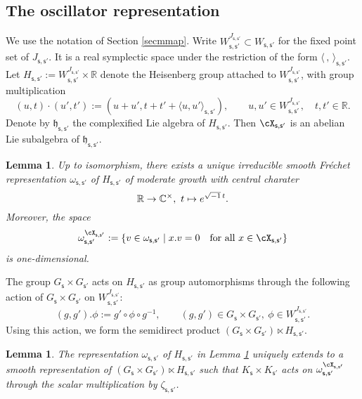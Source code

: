 \documentclass[12pt,a4paper]{amsart}
\newcommand{\h}{\mathfrak h}
\newcommand{\R}{\mathbb R}
\newcommand{\la}{\langle}
\newcommand{\ra}{\rangle}
\numberwithin{equation}{section}
\newtheorem{lem}[thm]{Lemma}
\theoremstyle{remark}
\begin{document}
\subsection{The oscillator representation}\label{secoscil}
We use the notation of Section \ref{secmmap}. Write
$
  W_{\mathsf s, \mathsf s'}^{J_{\mathsf s, \mathsf s'}}\subset W_{\mathsf s, \mathsf s'}
$
for the fixed point set of $J_{\mathsf s, \mathsf s'}$. It is a real symplectic space under the restriction of the form $\la\,,\,\ra_{\mathsf s, \mathsf s'}$. Let $H_{\mathsf s, \mathsf s'}:= W_{\mathsf s, \mathsf s'}^{J_{\mathsf s, \mathsf s'}}\times \R$
denote the Heisenberg group attached to $W_{\mathsf s, \mathsf s'}^{J_{\mathsf s, \mathsf s'}}$, with group multiplication
\[
  (u,t)\cdot (u', t'):=(u+u', t+t'+\la u, u'\ra_{\mathsf s, \mathsf s'}), \qquad u,u'\in  W_{\mathsf s, \mathsf s'}^{J_{\mathsf s, \mathsf s'}}, \quad t, t'\in \R.
\]
Denote by $\h_{\mathsf s, \mathsf s'}$ the complexified Lie algebra of $H_{\mathsf s, \mathsf s'}$. Then  $\cX_{\mathsf s, \mathsf s'}$ is  an abelian Lie subalgebra of $\h_{\mathsf s, \mathsf s'}$.

\begin{lem}\label{vn}
Up to isomorphism, there exists a unique irreducible smooth Fr\'echet representation $\omega_{\mathsf s, \mathsf s'}$ of $H_{\mathsf s, \mathsf s'}$ of moderate growth with central charater
\[
\R\rightarrow \C^\times, \ t\mapsto e^{\sqrt{-1}\, t}.
\]
Moreover, the space
\[
  \omega_{\mathsf s, \mathsf s'}^{\cX_{\mathsf s, \mathsf s'}}:=\{v\in \omega_{\mathsf s, \mathsf s'}\mid x.v=0\quad \textrm{for all $x\in \cX_{\mathsf s, \mathsf s'}$}\}
\]
is one-dimensional.
\end{lem}



The group $G_{\mathsf s}\times G_{\mathsf s'}$ acts on $H_{\mathsf s, \mathsf s'}$ as group automorphisms through the following action of $G_{\mathsf s}\times G_{\mathsf s'}$ on  $W_{\mathsf s, \mathsf s'}^{J_{\mathsf s, \mathsf s'}}$:
\[
  (g, g').\phi:=g'\circ \phi\circ g^{-1}, \qquad (g,g')\in G_{\mathsf s}\times G_{\mathsf s'},\ \phi\in W_{\mathsf s, \mathsf s'}^{J_{\mathsf s, \mathsf s'}}.
\]
Using this action, we form the semidirect product $(G_{\mathsf s}\times G_{\mathsf s'})\ltimes H_{\mathsf s, \mathsf s'}$.



\begin{lem}\label{deforos}
The representation $\omega_{\mathsf s, \mathsf s'}$ of $H_{\mathsf s, \mathsf s'}$ in Lemma \ref{vn} uniquely extends to a  smooth representation of $(G_{\mathsf s}\times G_{\mathsf s'})\ltimes H_{\mathsf s, \mathsf s'}$ such  that $K_{\mathsf s}\times  K_{\mathsf s'}$ acts on  $ \omega_{\mathsf s, \mathsf s'}^{\cX_{\mathsf s, \mathsf s'}}$ through the scalar multiplication by $\zeta_{\mathsf s, \mathsf s'}$.
\end{lem}
\end{document}
